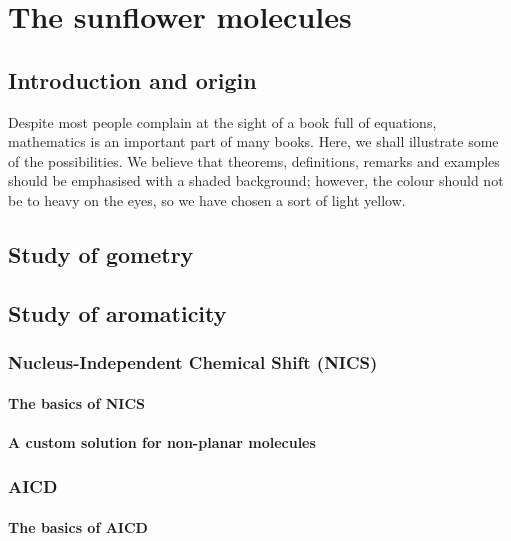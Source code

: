 \setchapterpreamble[u]{\margintoc}
\chapter{The sunflower molecules}


\section{Introduction and origin}

\blindtext

Despite most people complain at the sight of a book full of equations,
mathematics is an important part of many books. Here, we shall
illustrate some of the possibilities. We believe that theorems,
definitions, remarks and examples should be emphasised with a shaded
background; however, the colour should not be to heavy on the eyes, so
we have chosen a sort of light yellow.


\section{Study of gometry}

\blindtext


\section{Study of aromaticity}

\subsection{Nucleus-Independent Chemical Shift (NICS)}
\blindtext
\subsubsection{The basics of NICS}
\blindtext
\subsubsection{A custom solution for non-planar molecules}
\blindtext

\subsection{AICD}
\subsubsection{The basics of AICD}
\blindtext
